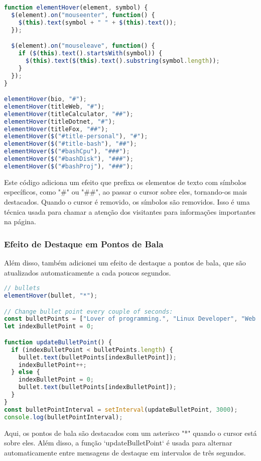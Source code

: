 \documentclass{article}
\begin{document}
\begin{lstlisting}[language=JavaScript]
function elementHover(element, symbol) {
  $(element).on("mouseenter", function() {
    $(this).text(symbol + " " + $(this).text());
  });

  $(element).on("mouseleave", function() {
    if ($(this).text().startsWith(symbol)) {
      $(this).text($(this).text().substring(symbol.length));
    }
  });
}

elementHover(bio, "#");
elementHover(titleWeb, "#");
elementHover(titleCalculator, "##");
elementHover(titleDotnet, "#");
elementHover(titleFox, "##");
elementHover($("#title-personal"), "#");
elementHover($("#title-bash"), "##");
elementHover($("#bashCpu"), "###");
elementHover($("#bashDisk"), "###");
elementHover($("#bashProj"), "###");
\end{lstlisting}

Este código adiciona um efeito que prefixa os elementos de texto com símbolos específicos, como "\#" ou "\#\#", ao passar o cursor sobre eles, tornando-os mais destacados. Quando o cursor é removido, os símbolos são removidos. Isso é uma técnica usada para chamar a atenção dos visitantes para informações importantes na página.

\newpage

\subsubsection{Efeito de Destaque em Pontos de Bala}
Além disso, também adicionei um efeito de destaque a pontos de bala, que são atualizados automaticamente a cada poucos segundos.

\begin{lstlisting}[language=JavaScript]
// bullets
elementHover(bullet, "*");

// Change bullet point every couple of seconds:
const bulletPoints = ["Lover of programming.", "Linux Developer", "Web Developer"];
let indexBulletPoint = 0;

function updateBulletPoint() {
  if (indexBulletPoint < bulletPoints.length) {
    bullet.text(bulletPoints[indexBulletPoint]);
    indexBulletPoint++;
  } else {
    indexBulletPoint = 0;
    bullet.text(bulletPoints[indexBulletPoint]);
  }
}
const bulletPointInterval = setInterval(updateBulletPoint, 3000);
console.log(bulletPointInterval);
\end{lstlisting}

Aqui, os pontos de bala são destacados com um asterisco "*" quando o cursor está sobre eles. Além disso, a função `updateBulletPoint` é usada para alternar automaticamente entre mensagens de destaque em intervalos de três segundos.
\end{document}
